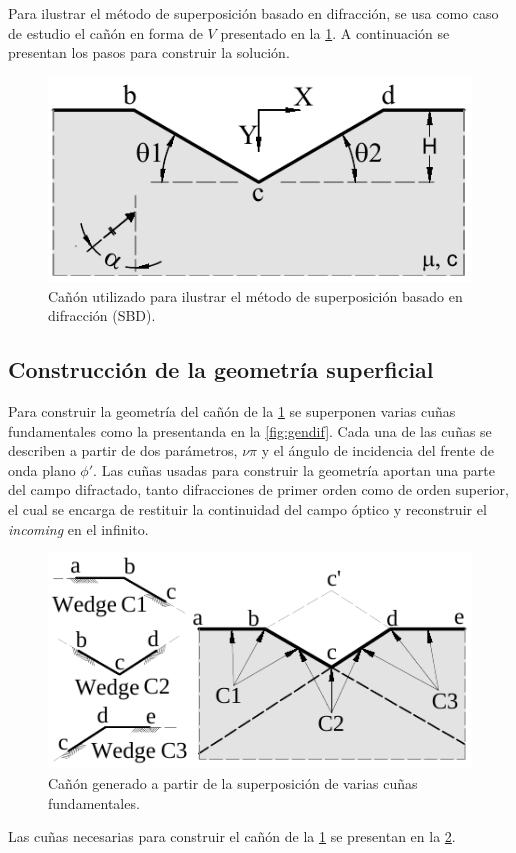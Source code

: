 \documentclass[spanish,letterpaper,12pt,twoside,openany]{article}
\begin{document}
%
Para ilustrar el método de superposición basado en difracción, se usa como caso de estudio el cañón en forma de $V$ presentado en la \cref{fig:canongen}. A continuación se presentan los pasos para construir la solución.
%
\begin{figure}[H]
	\centering
	\includegraphics[width=10 cm]{img/vshaped1.pdf}
	\caption{Cañón utilizado para ilustrar el método de superposición basado en difracción (SBD).}
	\label{fig:canongen}
\end{figure}
%
%
%
%
%
\subsection{Construcción de la geometría superficial}
%
Para construir la geometría del cañón de la \cref{fig:canongen} se superponen varias cuñas fundamentales como la presentanda en la \cref{fig:gendif}. Cada una de las cuñas se describen a partir de dos parámetros, $\nu \pi$ y el ángulo de incidencia del frente de onda plano $\phi'$. Las cuñas usadas para construir la geometría aportan una parte del campo difractado, tanto difracciones de primer orden como de orden superior, el cual se encarga de restituir la continuidad del campo óptico y reconstruir el \textit{incoming} en el infinito.
%
\begin{figure}[H]
   \centering
    \includegraphics[width=10 cm]{img/vshapedw.pdf}
   \caption{Cañón generado a partir de la superposición de varias cuñas fundamentales.}
   \label{fig:canonsuper}
\end{figure}
%
Las cuñas necesarias para construir el cañón de la \cref{fig:canongen} se presentan en la \cref{fig:canonsuper}.
%
%
%
%
%
\end{document}
